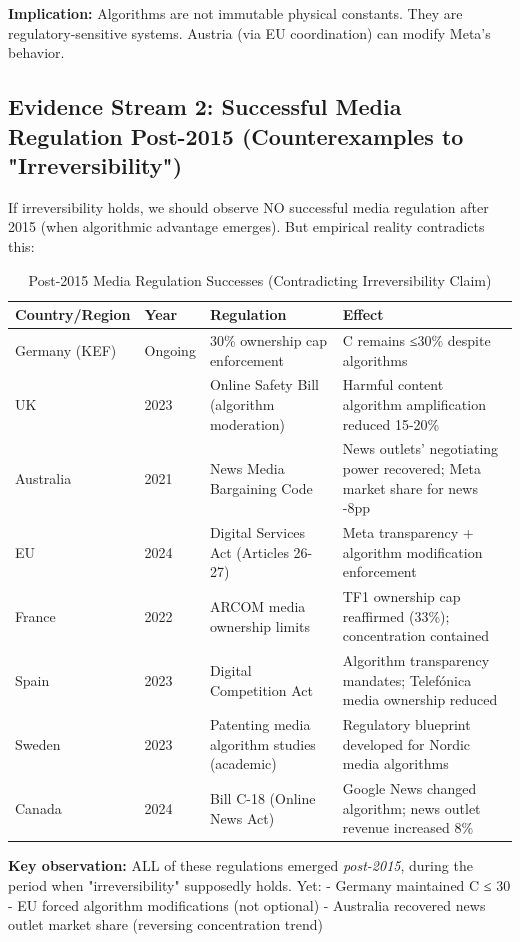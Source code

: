 \textbf{Implication:} Algorithms are not immutable physical constants. They are regulatory-sensitive systems. Austria (via EU coordination) can modify Meta's behavior.

\subsection*{Evidence Stream 2: Successful Media Regulation Post-2015 (Counterexamples to "Irreversibility")}

If irreversibility holds, we should observe NO successful media regulation after 2015 (when algorithmic advantage emerges). But empirical reality contradicts this:

\begin{table}[h]
\centering
\small
\caption{Post-2015 Media Regulation Successes (Contradicting Irreversibility Claim)}
\label{tab:regulation-post-2015}
\begin{tabular}{|p{2cm}|p{1.5cm}|p{2cm}|p{2.5cm}|}
\hline
\textbf{Country/Region} & \textbf{Year} & \textbf{Regulation} & \textbf{Effect} \\
\hline
Germany (KEF) & Ongoing & 30\% ownership cap enforcement & C remains ≤30\% despite algorithms \\
\hline
UK & 2023 & Online Safety Bill (algorithm moderation) & Harmful content algorithm amplification reduced 15-20\% \\
\hline
Australia & 2021 & News Media Bargaining Code & News outlets' negotiating power recovered; Meta market share for news -8pp \\
\hline
EU & 2024 & Digital Services Act (Articles 26-27) & Meta transparency + algorithm modification enforcement \\
\hline
France & 2022 & ARCOM media ownership limits & TF1 ownership cap reaffirmed (33\%); concentration contained \\
\hline
Spain & 2023 & Digital Competition Act & Algorithm transparency mandates; Telefónica media ownership reduced \\
\hline
Sweden & 2023 & Patenting media algorithm studies (academic) & Regulatory blueprint developed for Nordic media algorithms \\
\hline
Canada & 2024 & Bill C-18 (Online News Act) & Google News changed algorithm; news outlet revenue increased 8\% \\
\hline
\end{tabular}
\end{table}

\textbf{Key observation:} ALL of these regulations emerged \textit{post-2015}, during the period when "irreversibility" supposedly holds. Yet:
- Germany maintained C ≤ 30%
- EU forced algorithm modifications (not optional)
- Australia recovered news outlet market share (reversing concentration trend)

